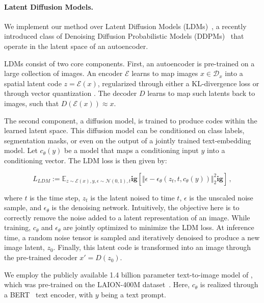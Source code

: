 \paragraph{Latent Diffusion Models.} We implement our method over Latent Diffusion Models (LDMs)~\citep{rombach2021highresolution}, a recently introduced class of Denoising Diffusion Probabilistic Models (DDPMs)~\citep{ho2020denoising} that operate in the latent space of an autoencoder. 

LDMs consist of two core components. First, an autoencoder is pre-trained on a large collection of images. An encoder $\mathcal{E}$ learns to map images $x\in \mathcal{D}_x$ into a spatial latent code $z = \mathcal{E}(x)$, regularized through either a KL-divergence loss or through vector quantization \citep{van2017neural,agustsson2017soft}. The decoder $D$ learns to map such latents back to images, such that $D\left(\mathcal{E}(x)\right)\approx x$.

The second component, a diffusion model, is trained to produce codes within the learned latent space. This diffusion model can be conditioned on class labels, segmentation masks, or even on the output of a jointly trained text-embedding model. Let $c_\theta(y)$ be a model that maps a conditioning input $y$ into a conditioning vector. The LDM loss is then given by:

\begin{equation}
    L_{LDM} := \mathbb{E}_{z\sim\mathcal{E}(x), y, \epsilon \sim \mathcal{N}(0, 1), t }\mathbf{ig}[ \Vert \epsilon - \epsilon_\theta(z_{t},t, c_\theta(y)) \Vert_{2}^{2}\mathbf{ig}] \, ,
    \label{eq:LDM_loss}
\end{equation}

where $t$ is the time step, $z_t$ is the latent noised to time $t$, $\epsilon$ is the unscaled noise sample, and $\epsilon_\theta$ is the denoising network. Intuitively, the objective here is to correctly remove the noise added to a latent representation of an image. While training, $c_\theta$ and $\epsilon_\theta$ are jointly optimized to minimize the LDM loss. At inference time, a random noise tensor is sampled and iteratively denoised to produce a new image latent, $z_0$. Finally, this latent code is transformed into an image through the pre-trained decoder $x' = D(z_0)$.

We employ the publicly available 1.4 billion parameter text-to-image model of \citet{rombach2021highresolution}, which was pre-trained on the LAION-400M dataset~\citep{schuhmann2021laion}. Here, $c_\theta$ is realized through a BERT~\citep{devlin2018bert} text encoder, with $y$ being a text prompt. 

